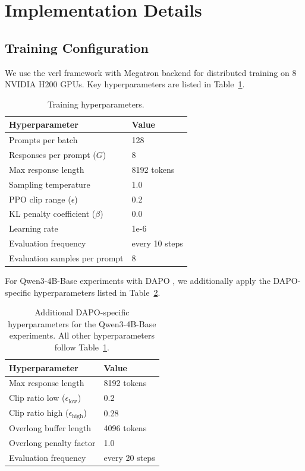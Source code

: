 \section{Implementation Details}
\label{sec:appendix-impl}

\subsection{Training Configuration}

We use the verl framework \citep{sheng2024hybridflow} with Megatron backend for distributed training on 8 NVIDIA H200 GPUs. Key hyperparameters are listed in Table~\ref{tab:hyperparams}.

\begin{table}[h]
\centering
\small
\begin{tabular}{ll}
\toprule
\textbf{Hyperparameter} & \textbf{Value} \\
\midrule
Prompts per batch & 128 \\
Responses per prompt ($G$) & 8 \\
Max response length & 8192 tokens \\
Sampling temperature & 1.0 \\
PPO clip range ($\epsilon$) & 0.2 \\
KL penalty coefficient ($\beta$) & 0.0 \\
Learning rate & 1e-6 \\
Evaluation frequency & every 10 steps \\
Evaluation samples per prompt & 8 \\
\bottomrule
\end{tabular}
\caption{Training hyperparameters.}
\label{tab:hyperparams}
\end{table}

For Qwen3-4B-Base experiments with DAPO \citep{Yu2025a}, we additionally apply the DAPO-specific hyperparameters listed in Table~\ref{tab:dapo_hyperparams}.

\begin{table}[h]
\centering
\small
\begin{tabular}{ll}
\toprule
\textbf{Hyperparameter} & \textbf{Value} \\
\midrule
Max response length & 8192 tokens \\
Clip ratio low ($\epsilon_{\text{low}}$) & 0.2 \\
Clip ratio high ($\epsilon_{\text{high}}$) & 0.28 \\
Overlong buffer length & 4096 tokens \\
Overlong penalty factor & 1.0 \\
Evaluation frequency & every 20 steps \\
\bottomrule
\end{tabular}
\caption{Additional DAPO-specific hyperparameters for the Qwen3-4B-Base experiments. All other hyperparameters follow Table~\ref{tab:hyperparams}.}
\label{tab:dapo_hyperparams}
\end{table}

